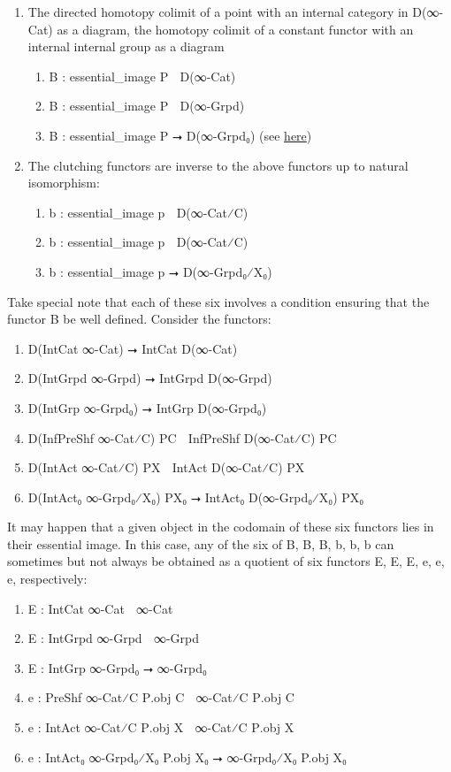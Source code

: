 \documentclass{book}
\theoremstyle{definition}
\begin{document}
\begin{enumerate}
\item The directed homotopy colimit of a point with an internal category in D(∞-Cat) as a diagram, the homotopy colimit of a constant functor with an internal internal group as a diagram
\begin{enumerate}
\item B⃗ : essential\_image P⃗ ⭢ D(∞-Cat)
\item B⃡ : essential\_image P⃡ ⭢ D(∞-Grpd)
\item B : essential\_image P ⭢ D(∞-Grpd₀) (see \href{https://mathoverflow.net/questions/128883/why-omega-x-and-bg-are-adjoint-functors}{here})
\end{enumerate}
\item The clutching functors are inverse to the above functors up to natural isomorphism:
\begin{enumerate}
\item b⃗ : essential\_image p⃗ ⭢ D(∞-Cat⁄C)
\item b⃡ : essential\_image p⃡ ⭢ D(∞-Cat⁄C)
\item b : essential\_image p ⭢ D(∞-Grpd₀⁄X₀) 
\end{enumerate}
\end{enumerate}

Take special note that each of these six involves a condition ensuring that the functor B⃗ be well defined. Consider the functors:

\begin{enumerate}
\item D(IntCat ∞-Cat) ⭢ IntCat D(∞-Cat)
\item D(IntGrpd ∞-Grpd) ⭢ IntGrpd D(∞-Grpd)
\item D(IntGrp ∞-Grpd₀) ⭢ IntGrp D(∞-Grpd₀)
\item D(InfPreShf ∞-Cat⁄C) P⃗C ⭢ InfPreShf D(∞-Cat⁄C) P⃗C
\item D(IntAct ∞-Cat⁄C) P⃡X ⭢ IntAct D(∞-Cat⁄C) P⃡X
\item D(IntAct₀ ∞-Grpd₀⁄X₀) PX₀ ⭢ IntAct₀ D(∞-Grpd₀⁄X₀) PX₀
\end{enumerate}

It may happen that a given object in the codomain of these six functors lies in their essential image. In this case, any of the six of B⃗, B⃡, B, b⃗, b⃡, b can sometimes but not always be obtained as a quotient of six functors E⃗, E⃡, E, e⃗, e⃡, e, respectively:

\begin{enumerate}
\item E⃗ : IntCat ∞-Cat ⭢ ∞-Cat
\item E⃡ : IntGrpd ∞-Grpd ⭢ ∞-Grpd
\item E : IntGrp ∞-Grpd₀ ⭢ ∞-Grpd₀
\item e⃗ : PreShf ∞-Cat⁄C P⃗.obj C ⭢ ∞-Cat⁄C P⃗.obj C
\item e⃡ : IntAct ∞-Cat⁄C P⃡.obj X ⭢ ∞-Cat⁄C P⃡.obj X
\item e : IntAct₀ ∞-Grpd₀⁄X₀ P.obj X₀ ⭢ ∞-Grpd₀⁄X₀ P.obj X₀
\end{enumerate}
\end{document}
